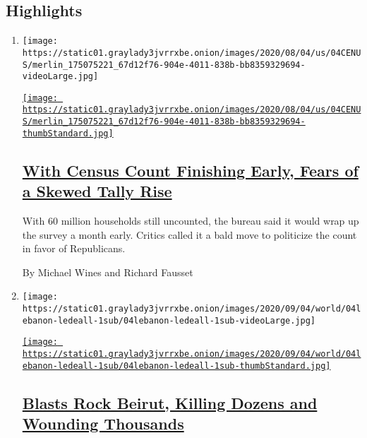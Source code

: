 \hypertarget{highlights}{%
\subsection{Highlights}\label{highlights}}

\begin{enumerate}
\def\labelenumi{\arabic{enumi}.}
\item
  \texttt{[image: https://static01.graylady3jvrrxbe.onion/images/2020/08/04/us/04CENUS/merlin\_175075221\_67d12f76-904e-4011-838b-bb8359329694-videoLarge.jpg]}

  \href{/2020/08/04/us/2020-census-ending-early.html}{\texttt{[image: https://static01.graylady3jvrrxbe.onion/images/2020/08/04/us/04CENUS/merlin\_175075221\_67d12f76-904e-4011-838b-bb8359329694-thumbStandard.jpg]}}

  \hypertarget{with-census-count-finishing-early-fears-of-a-skewed-tally-rise}{%
  \subsection{\texorpdfstring{\href{/2020/08/04/us/2020-census-ending-early.html}{With
  Census Count Finishing Early, Fears of a Skewed Tally
  Rise}}{With Census Count Finishing Early, Fears of a Skewed Tally Rise}}\label{with-census-count-finishing-early-fears-of-a-skewed-tally-rise}}

  With 60 million households still uncounted, the bureau said it would
  wrap up the survey a month early. Critics called it a bald move to
  politicize the count in favor of Republicans.

  By Michael Wines and Richard Fausset
\item
  \texttt{[image: https://static01.graylady3jvrrxbe.onion/images/2020/09/04/world/04lebanon-ledeall-1sub/04lebanon-ledeall-1sub-videoLarge.jpg]}

  \href{/2020/08/04/world/middleeast/lebanon-explosion.html}{\texttt{[image: https://static01.graylady3jvrrxbe.onion/images/2020/09/04/world/04lebanon-ledeall-1sub/04lebanon-ledeall-1sub-thumbStandard.jpg]}}

  \hypertarget{blasts-rock-beirut-killing-dozens-and-wounding-thousands}{%
  \subsection{\texorpdfstring{\href{/2020/08/04/world/middleeast/lebanon-explosion.html}{Blasts
  Rock Beirut, Killing Dozens and Wounding
  Thousands}}{Blasts Rock Beirut, Killing Dozens and Wounding Thousands}}\label{blasts-rock-beirut-killing-dozens-and-wounding-thousands}}


\end{enumerate}
